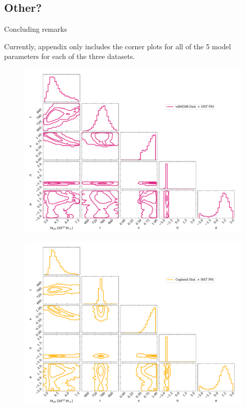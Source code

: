 \documentclass[twocolumn]{aastex631}
\begin{document}
\subsection{Other?}
Concluding remarks

\appendix
Currently, appendix only includes the corner plots for all of the 5 model parameters for each of the three datasets.
\begin{figure}[htb]
  \centering
  \includegraphics[width=0.8\columnwidth]{analyze-runs-all-vdm2012.pdf}
  \caption{\label{fig:contour-vdm}
  }
\end{figure}

\begin{figure}[htb]
  \centering
  \includegraphics[width=0.8\columnwidth]{analyze-runs-all-Dataset3.pdf}
  \caption{\label{fig:contour-dataset3}
  }
\end{figure}
\end{document}
